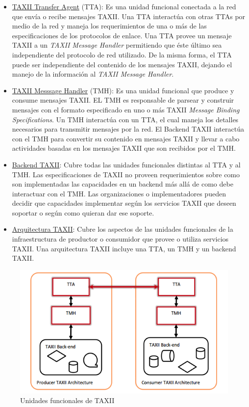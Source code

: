 \begin{itemize}
  \item \underline{TAXII Transfer Agent} (TTA): Es una unidad funcional conectada a la red 
  que envía o recibe mensajes TAXII. Una TTA interactúa con otras TTAs por medio 
  de la red y maneja los requerimientos de una o más de las especificaciones de 
  los protocolos de enlace. Una TTA provee un mensaje TAXII a un \textit{TAXII Message 
  Handler} permitiendo que éste último sea independiente del protocolo de red 
  utilizado. De la misma forma, el TTA puede ser independiente del contenido de 
  los mensajes TAXII, dejando el manejo de la información al \textit{TAXII Message 
  Handler}.
  \item \underline{TAXII Messsage Handler} (TMH): Es una unidad funcional que produce y 
  consume mensajes TAXII. EL TMH es responsable de parsear y construir mensajes 
  con el formato especificado en uno o más TAXII \textit{Message Binding Specifications}. 
  Un TMH interactúa con un TTA, el cual maneja los detalles necesarios para 
  transmitir mensajes por la red. El Backend TAXII interactúa con el TMH para 
  convertir su contenido en mensajes TAXII y llevar a cabo actividades basadas 
  en los mensajes TAXII que son recibidos por el TMH.
  \item \underline{Backend TAXII}: Cubre todas las unidades funcionales distintas al TTA y 
  al TMH. Las especificaciones de TAXII no proveen requerimientos sobre como son 
  implementadas las capacidades en un backend más allá de como debe interactuar 
  con el TMH. Las organizaciones o implementadores pueden decidir que 
  capacidades implementar según los servicios TAXII que deseen soportar o según 
  como quieran dar ese soporte.
  \item \underline{Arquitectura TAXII}: Cubre los aspectos de las unidades funcionales de la 
  infraestructura de productor o consumidor que provee o utiliza servicios 
  TAXII. Una arquitectura TAXII incluye una TTA, un TMH y un backend TAXII.
  \end{itemize}

\begin{figure}[ht!]
  \centering
    \includegraphics[width=150mm]{./images/TAXIIArchitecture.png}
    \caption{Unidades funcionales de TAXII \protect\cite{b1}}
\end{figure}

